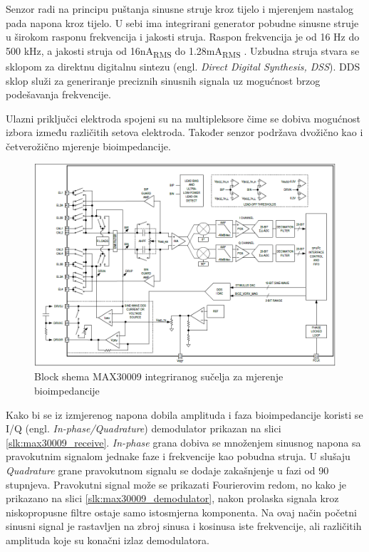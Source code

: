 \documentclass[../diplomski_rad.tex]{subfiles}
\begin{document}
Senzor radi na principu puštanja sinusne struje kroz tijelo i mjerenjem nastalog pada napona kroz tijelo. 
U sebi ima integrirani generator pobudne sinusne struje u širokom rasponu frekvencija i jakosti struja. 
Raspon frekvencija je od 16 Hz do 500 kHz, a jakosti struja od 16nA\textsubscript{RMS} do 1.28mA\textsubscript{RMS} \cite{max30009}.
Uzbudna struja stvara se sklopom za direktnu digitalnu sintezu (engl. \textit{Direct Digital Synthesis, DSS}). 
DDS sklop služi za generiranje preciznih sinusnih signala uz mogućnost brzog podešavanja frekvencije.  

Ulazni priključci elektroda spojeni su na multipleksore čime se dobiva mogućnost izbora 
između različitih setova elektroda. Također senzor podržava dvožično kao i četverožično mjerenje bioimpedancije.

\begin{figure}[htb]
    \centering
    \includegraphics[width=1\textwidth]{Figures/max30009_bioz.png} 
    \caption{Block shema MAX30009 integriranog sučelja za mjerenje bioimpedancije \cite{max30009_datasheet}}
    \label{slk:max30009_bioz}
\end{figure}

Kako bi se iz izmjerenog napona dobila amplituda i faza bioimpedancije koristi se I/Q (engl. \textit{In-phase/Quadrature}) 
demodulator prikazan na slici \ref{slk:max30009_receive}. 
\textit{In-phase} grana dobiva se množenjem sinusnog napona sa pravokutnim signalom jednake faze i frekvencije kao pobudna struja.
U slušaju \textit{Quadrature} grane pravokutnom signalu se dodaje zakašnjenje u fazi od 90 stupnjeva.  
Pravokutni signal može se prikazati Fourierovim redom, no kako je prikazano na slici \ref{slk:max30009_demodulator}, 
nakon prolaska signala kroz niskopropusne filtre ostaje samo istosmjerna komponenta. 
Na ovaj način početni sinusni signal je rastavljen na zbroj sinusa i kosinusa iste frekvencije, ali različitih amplituda koje su 
konačni izlaz demodulatora.
\end{document}

